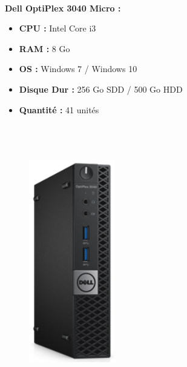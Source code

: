 \documentclass[11pt,a4paper,oneside]{article}
\begin{document}
\paragraph{}\textbf{Dell OptiPlex 3040 Micro :} \\
\begin{itemize}
\item \textbf{CPU :} Intel Core i3
\item \textbf{RAM :} 8 Go
\item \textbf{OS :} Windows 7 / Windows 10
\item \textbf{Disque Dur :} 256 Go SDD / 500 Go HDD
\item \textbf{Quantité :} 41 unités
\\ \\ \\ \\
\end{itemize}
\begin{figure}
\includegraphics[scale=0.4]{Ressources/Materiel/3040.png}\vspace{-2cm}
\end{figure}
\end{document}
